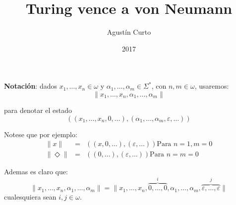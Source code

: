 \documentclass[12pt]{beamer}
\author{Agustín Curto}
\title{Turing vence a von Neumann}
\institute{FaMAF}
\date{2017}
\newcommand{\SIGMA}{\Sigma^{\ast}}
\newcommand{\PN}{\par\noindent}
\begin{document}
\begin{frame}
	\titlepage
\end{frame}

\begin{frame}
	\textbf{Notación}: dados $x_{1}, \dotsc, x_{n} \in \omega$ y $\alpha_{1}, \dotsc,\alpha_{m} \in \SIGMA$, con $n, m \in
	\omega $, usaremos:
	\begin{equation*}
		\lVert x_{1}, \dotsc, x_{n}, \alpha_{1}, \dotsc, \alpha_{m} \rVert
	\end{equation*}

	\PN para denotar el estado
	\begin{equation*}
		\left((x_{1}, \dotsc, x_{n}, 0, \dotsc), (\alpha_{1}, \dotsc, \alpha_{m}, \varepsilon, \dotsc)\right)
	\end{equation*}

	\PN Notese que por ejemplo:
	\begin{eqnarray*}
	\lVert x \rVert &=& \left((x, 0, \dotsc), (\varepsilon, \dotsc)\right) \text{Para } n = 1, m = 0 \\
	\lVert \Diamond \rVert &=& \left((0, \dotsc), (\varepsilon, \dotsc)\right) \text{Para } n = m = 0
	\end{eqnarray*}

	\PN Ademas es claro que:
	\[
		\lVert x_{1}, \dotsc, x_{n}, \alpha_{1}, \dotsc, \alpha_{m} \rVert = \lVert x_{1}, \dotsc, x_{n},
		\overset{i}{\overbrace{0, \dotsc, 0}}, \alpha_{1}, \dotsc, \alpha_{m}, \overset{j}{\overbrace{\varepsilon, \dotsc,
		\varepsilon}} \rVert
	\]
	cualesquiera sean $i, j \in \omega$.
\end{frame}
\end{document}
